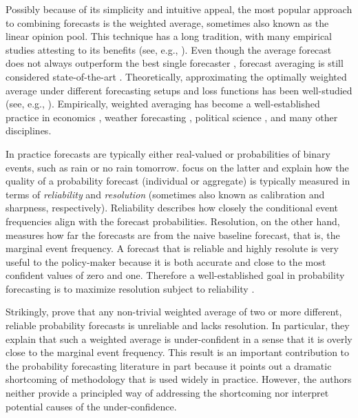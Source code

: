 \documentclass[11pt]{article}
\theoremstyle{definition}
\theoremstyle{definition}
\begin{document}
Possibly because of its simplicity and intuitive appeal, the most
popular approach to combining forecasts is the weighted average, sometimes also known as the linear opinion pool. 
This technique has a long tradition, with many empirical studies attesting to its benefits (see, e.g., \citealt{bates1969combination, clemen1989combining, armstrong2}). 
Even though the average forecast does not always outperform the best single forecaster \citep{hibon2005combine},
forecast averaging is still considered state-of-the-art \citep{elliott2013handbook}. Theoretically,  approximating the optimally weighted average under different forecasting setups and loss functions has been well-studied (see, e.g., \citealt{juditsky2008learning, degroot1991optimal}). Empirically, weighted averaging has become a well-established practice in economics \citep{blix2001good},  weather forecasting \citep{raftery2005using}, political science \citep{graefea2014combining}, and many other disciplines.
%


In practice forecasts are typically either real-valued or probabilities of binary events, such as rain or no
rain tomorrow. \cite{Ranjan08} focus on the latter and
 explain how the quality of a probability forecast
(individual or aggregate) is typically measured in terms of
\textit{reliability} and \textit{resolution} (sometimes also known as calibration and
sharpness, respectively). Reliability describes how closely the
conditional event frequencies align with the forecast
probabilities. Resolution, on the other hand, measures how far the
forecasts are from the naive baseline forecast, that is, the marginal
event frequency. A forecast that is reliable and highly resolute is
very useful to the policy-maker because it is both accurate and close
to the most confident values of zero and one. Therefore a
well-established goal in probability forecasting is to maximize resolution subject to
reliability \citep{murphy1987general, gneiting2007probabilistic}.


Strikingly, \cite{Ranjan08} prove that any non-trivial weighted average
of two or more different, reliable probability forecasts is
unreliable and lacks resolution. In particular, they explain that such
a weighted average is  under-confident in a sense that it is overly
close to the marginal event frequency. This result is an important
contribution to the probability forecasting literature in part
because it points out a dramatic shortcoming of methodology that is
used widely in practice. However, the authors neither provide a
principled way of addressing the shortcoming nor interpret potential causes of the under-confidence. 
\end{document}
